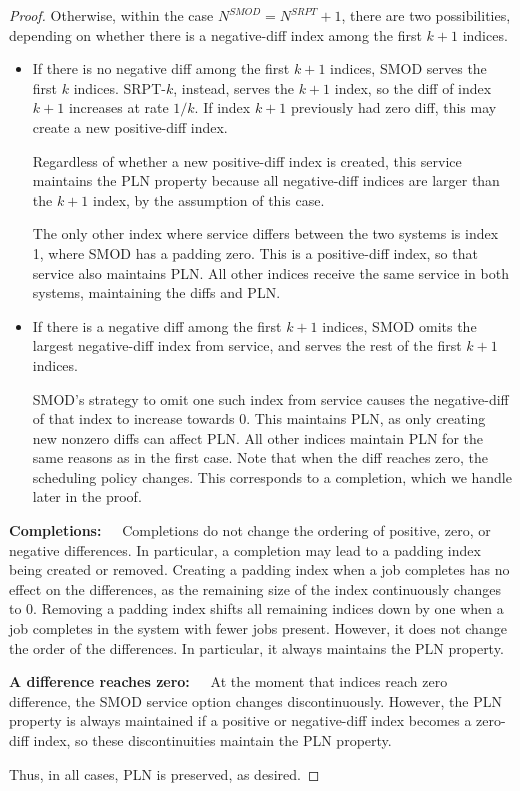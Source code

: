 \documentclass[acmsmall]{acmart}
\begin{document}
\begin{proof}
    Otherwise, within the case $N^{SMOD} = N^{SRPT} + 1$, there are two possibilities, depending on whether there is a negative-diff index among the first $k+1$ indices.
    \begin{itemize}
        \item If there is no negative diff among the first $k+1$ indices, SMOD serves the first $k$ indices.
        SRPT-$k$, instead, serves the $k+1$ index, so the diff of index $k+1$ increases at rate $1/k$. If index $k+1$ previously had zero diff, this may create a new positive-diff index. 
        
        Regardless of whether a new positive-diff index is created, this service maintains the PLN property because all negative-diff indices are larger than the $k+1$ index, by the assumption of this case. 
        
        The only other index where service differs between the two systems is index 1, where SMOD has a padding zero. This is a positive-diff index, so that service also maintains PLN. All other indices receive the same service in both systems, maintaining the diffs and PLN.
        
        \item If there is a negative diff among the first $k+1$ indices, SMOD omits the largest negative-diff index from service, and serves the rest of the first $k+1$ indices. 
        
        SMOD's strategy to omit one such index from service causes the negative-diff of that index to increase towards 0. This maintains PLN, as only creating new nonzero diffs can affect PLN. All other indices maintain PLN for the same reasons as in the first case.  Note that when the diff reaches zero, the scheduling policy changes. This corresponds to a completion, which we handle later in the proof.
    \end{itemize}

    \textbf{Completions:~~}
    Completions do not change the ordering of positive, zero, or negative differences.
    In particular, a completion may lead to a padding index being created or removed.
    Creating a padding index when a job completes has no effect on the differences,
    as the remaining size of the index continuously changes to 0.
    Removing a padding index shifts all remaining indices down by one when a job completes in the system with fewer jobs present. However, it does not change the order of the differences.
    In particular, it always maintains the PLN property.

    \textbf{A difference reaches zero:~~}
    At the moment that indices reach zero difference, the SMOD service option changes discontinuously. 
    However, the PLN property is always maintained if a positive or negative-diff index
    becomes a zero-diff index, so these discontinuities maintain the PLN property.

    Thus, in all cases, PLN is preserved, as desired.
\end{proof}
\end{document}
